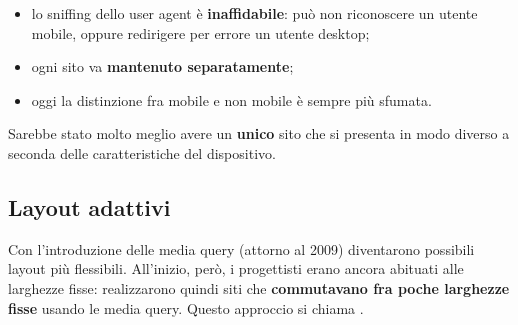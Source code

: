 \begin{itemize}
  \item lo sniffing dello user agent è \textbf{inaffidabile}: può non
        riconoscere un utente mobile, oppure redirigere per errore un utente
        desktop;
  \item ogni sito va \textbf{mantenuto separatamente};
  \item oggi la distinzione fra mobile e non mobile è sempre più sfumata.
\end{itemize}

Sarebbe stato molto meglio avere un \textbf{unico} sito che si presenta in modo
diverso a seconda delle caratteristiche del dispositivo.

\subsection{Layout adattivi}

Con l'introduzione delle media query (attorno al 2009) diventarono possibili
layout più flessibili. All'inizio, però, i progettisti erano ancora abituati
alle larghezze fisse: realizzarono quindi siti che \textbf{commutavano fra
poche larghezze fisse} usando le media query. Questo approccio si chiama
.

